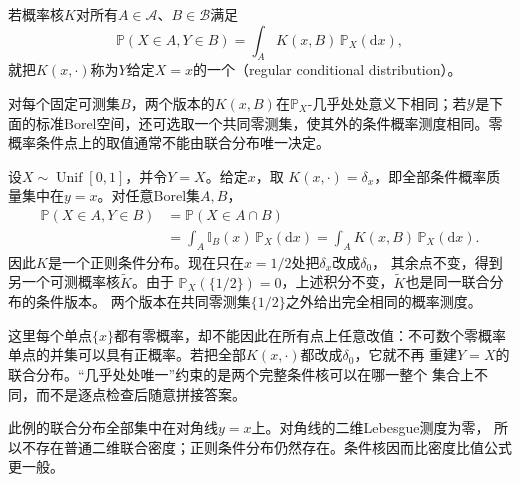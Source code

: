 \begin{definition}[正则条件分布]
  \label{def:probability-regular-conditional-distribution}
若概率核\(K\)对所有\(A\in\mathcal A\)、\(B\in\mathcal B\)满足
\begin{equation}
  \mathbb{P}(X\in A,Y\in B)
  =
  \int_A K(x,B)\,\mathbb{P}_X(\mathrm{d}x),
  \label{eq:probability-regular-conditional-kernel}
\end{equation}
就把\(K(x,\cdot)\)称为\(Y\)给定\(X=x\)的一个（regular conditional distribution）。
\end{definition}
对每个固定可测集\(B\)，两个版本的\(K(x,B)\)在\(\mathbb P_X\)-几乎处处意义下相同；若\(\mathcal Y\)是下面的标准Borel空间，还可选取一个共同零测集，使其外的条件概率测度相同。零概率条件点上的取值通常不能由联合分布唯一决定。

\begin{example}[条件分布版本可以怎样不同]
\label{ex:probability-conditional-kernel-versions}
设\(X\sim\operatorname{Unif}[0,1]\)，并令\(Y=X\)。给定\(x\)，取
\(K(x,\cdot)=\delta_x\)，即全部条件概率质量集中在\(y=x\)。对任意Borel集\(A,B\)，
\[
 \begin{aligned}
 \mathbb P(X\in A,Y\in B)
 &=\mathbb P(X\in A\cap B)\\
 &=\int_A\mathbb I_B(x)\,\mathbb P_X(\mathrm dx)
  =\int_A K(x,B)\,\mathbb P_X(\mathrm dx).
 \end{aligned}
\]
因此\(K\)是一个正则条件分布。现在只在\(x=1/2\)处把\(\delta_x\)改成\(\delta_0\)，
其余点不变，得到另一个可测概率核\(\widetilde K\)。由于
\(\mathbb P_X(\{1/2\})=0\)，上述积分不变，\(\widetilde K\)也是同一联合分布的条件版本。
两个版本在共同零测集\(\{1/2\}\)之外给出完全相同的概率测度。

这里每个单点\(\{x\}\)都有零概率，却不能因此在所有点上任意改值：不可数个零概率
单点的并集可以具有正概率。若把全部\(K(x,\cdot)\)都改成\(\delta_0\)，它就不再
重建\(Y=X\)的联合分布。“几乎处处唯一”约束的是两个完整条件核可以在哪一整个
集合上不同，而不是逐点检查后随意拼接答案。

此例的联合分布全部集中在对角线\(y=x\)上。对角线的二维Lebesgue测度为零，
所以不存在普通二维联合密度；正则条件分布仍然存在。条件核因而比密度比值公式更一般。
\end{example}

